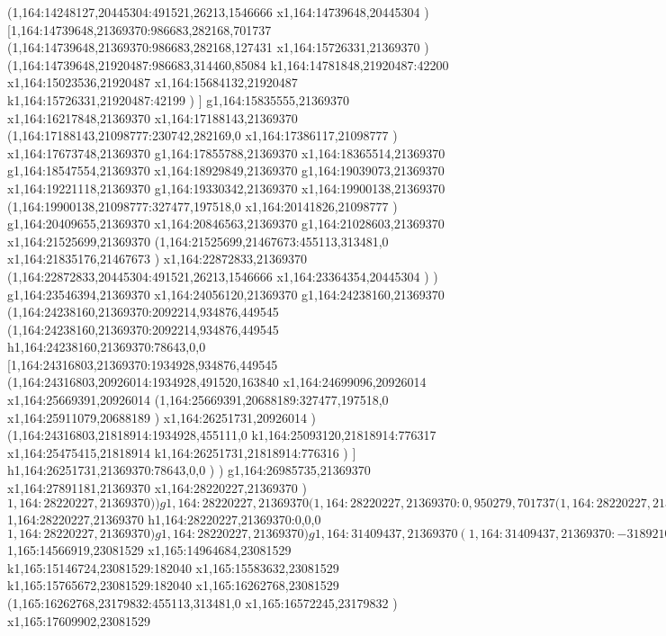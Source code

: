 {(1,164:14248127,20445304:491521,26213,1546666
x1,164:14739648,20445304
)
[1,164:14739648,21369370:986683,282168,701737
(1,164:14739648,21369370:986683,282168,127431
x1,164:15726331,21369370
)
(1,164:14739648,21920487:986683,314460,85084
k1,164:14781848,21920487:42200
x1,164:15023536,21920487
x1,164:15684132,21920487
k1,164:15726331,21920487:42199
)
]
g1,164:15835555,21369370
x1,164:16217848,21369370
x1,164:17188143,21369370
(1,164:17188143,21098777:230742,282169,0
x1,164:17386117,21098777
)
x1,164:17673748,21369370
g1,164:17855788,21369370
x1,164:18365514,21369370
g1,164:18547554,21369370
x1,164:18929849,21369370
g1,164:19039073,21369370
x1,164:19221118,21369370
g1,164:19330342,21369370
x1,164:19900138,21369370
(1,164:19900138,21098777:327477,197518,0
x1,164:20141826,21098777
)
g1,164:20409655,21369370
x1,164:20846563,21369370
g1,164:21028603,21369370
x1,164:21525699,21369370
(1,164:21525699,21467673:455113,313481,0
x1,164:21835176,21467673
)
x1,164:22872833,21369370
(1,164:22872833,20445304:491521,26213,1546666
x1,164:23364354,20445304
)
)
g1,164:23546394,21369370
x1,164:24056120,21369370
g1,164:24238160,21369370
(1,164:24238160,21369370:2092214,934876,449545
(1,164:24238160,21369370:2092214,934876,449545
h1,164:24238160,21369370:78643,0,0
[1,164:24316803,21369370:1934928,934876,449545
(1,164:24316803,20926014:1934928,491520,163840
x1,164:24699096,20926014
x1,164:25669391,20926014
(1,164:25669391,20688189:327477,197518,0
x1,164:25911079,20688189
)
x1,164:26251731,20926014
)
(1,164:24316803,21818914:1934928,455111,0
k1,164:25093120,21818914:776317
x1,164:25475415,21818914
k1,164:26251731,21818914:776316
)
]
h1,164:26251731,21369370:78643,0,0
)
)
g1,164:26985735,21369370
x1,164:27891181,21369370
x1,164:28220227,21369370
)
$1,164:28220227,21369370
)
)
g1,164:28220227,21369370
(1,164:28220227,21369370:0,950279,701737
(1,164:28220227,21369370:0,0,0
$1,164:28220227,21369370
h1,164:28220227,21369370:0,0,0
$1,164:28220227,21369370
)
g1,164:28220227,21369370
)
g1,164:31409437,21369370
(1,164:31409437,21369370:-3189210,950279,701737
)
g1,164:28220227,21369370
)
(1,166:10437920,23081529:20971518,491520,163840
x1,166:12221959,23081529
k1,165:12396796,23081529:174837
x1,165:12724477,23081529
k1,165:12899313,23081529:174836
x1,165:13263403,23081529
x1,165:14155424,23081529
x1,165:14392082,23081529
k1,165:14566919,23081529:174837
$1,165:14566919,23081529
x1,165:14964684,23081529
k1,165:15146724,23081529:182040
x1,165:15583632,23081529
k1,165:15765672,23081529:182040
x1,165:16262768,23081529
(1,165:16262768,23179832:455113,313481,0
x1,165:16572245,23179832
)
x1,165:17609902,23081529
}
